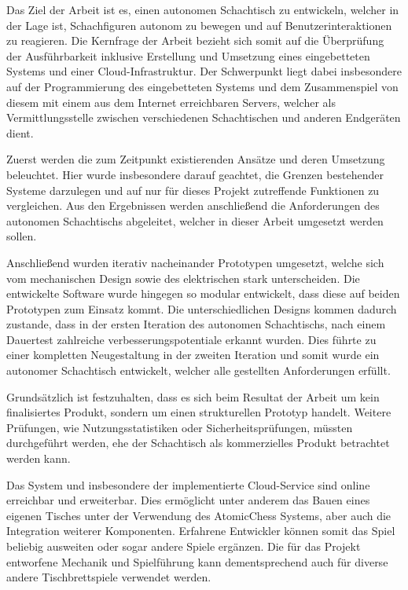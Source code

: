 Das Ziel der Arbeit ist es, einen autonomen Schachtisch zu entwickeln,
welcher in der Lage ist, Schachfiguren autonom zu bewegen und auf
Benutzerinteraktionen zu reagieren. Die Kernfrage der Arbeit bezieht
sich somit auf die Überprüfung der Ausführbarkeit inklusive Erstellung
und Umsetzung eines eingebetteten Systems und einer Cloud-Infrastruktur.
Der Schwerpunkt liegt dabei insbesondere auf der Programmierung des
eingebetteten Systems und dem Zusammenspiel von diesem mit einem aus dem
Internet erreichbaren Servers, welcher als Vermittlungsstelle zwischen
verschiedenen Schachtischen und anderen Endgeräten dient.

Zuerst werden die zum Zeitpunkt existierenden Ansätze und deren
Umsetzung beleuchtet. Hier wurde insbesondere darauf geachtet, die
Grenzen bestehender Systeme darzulegen und auf nur für dieses Projekt
zutreffende Funktionen zu vergleichen. Aus den Ergebnissen werden
anschließend die Anforderungen des autonomen Schachtischs abgeleitet,
welcher in dieser Arbeit umgesetzt werden sollen.

Anschließend wurden iterativ nacheinander Prototypen umgesetzt, welche
sich vom mechanischen Design sowie des elektrischen stark unterscheiden.
Die entwickelte Software wurde hingegen so modular entwickelt, dass
diese auf beiden Prototypen zum Einsatz kommt. Die unterschiedlichen
Designs kommen dadurch zustande, dass in der ersten Iteration des
autonomen Schachtischs, nach einem Dauertest zahlreiche
verbesserungspotentiale erkannt wurden. Dies führte zu einer kompletten
Neugestaltung in der zweiten Iteration und somit wurde ein autonomer
Schachtisch entwickelt, welcher alle gestellten Anforderungen erfüllt.

Grundsätzlich ist festzuhalten, dass es sich beim Resultat der Arbeit um
kein finalisiertes Produkt, sondern um einen strukturellen Prototyp
handelt. Weitere Prüfungen, wie Nutzungsstatistiken oder
Sicherheitsprüfungen, müssten durchgeführt werden, ehe der Schachtisch
als kommerzielles Produkt betrachtet werden kann.

Das System und insbesondere der implementierte Cloud-Service sind online
erreichbar und erweiterbar. Dies ermöglicht unter anderem das Bauen
eines eigenen Tisches unter der Verwendung des AtomicChess Systems, aber
auch die Integration weiterer Komponenten. Erfahrene Entwickler können
somit das Spiel beliebig ausweiten oder sogar andere Spiele ergänzen.
Die für das Projekt entworfene Mechanik und Spielführung kann
dementsprechend auch für diverse andere Tischbrettspiele verwendet
werden.
